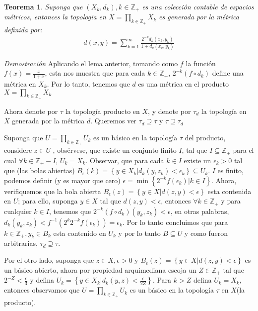 \documentclass[]{article}
\newtheorem{thm}{Teorema}
\newcommand{\set}[1]{\left\lbrace #1 \right\rbrace}
\newcommand{\ZZ}{\mathbb{Z}}
\newcommand{\contained}{\subseteq}
\begin{document}
\begin{thm}
	Suponga que $ (X_k,d_k), k \in \ZZ_+ $ es una colección  contable de espacios métricos, entonces la topologia en $ X = \prod_{k \in \ZZ_+}^{} X_k $ es generada por la métrica definida por:
	\begin{align} \label{newmetric}
	d(x,y) = \sum_{k =1}^{\infty} \frac{2^{-k} d_k(x_k,y_k)}{1 + d_k(x_k,y_k)}  
	\end{align} 
\end{thm}

\textit{Demostración} Aplicando el lema anterior, tomando como $f$ la función $f(x) = \frac{x}{1+x} $, esta nos muestra que para cada $ k \in \ZZ_+ $, $ 2^{-k}(f \circ d_k) $ define una métrica en $ X_k $. Por lo tanto, tenemos que $ d $ es una métrica en el producto $ X = \prod_{k \in \ZZ_+}^{}X_k $

Ahora denote por $ \tau $ la topología producto  en $X$, y denote por $ \tau_d $ la topología en $X$ generada por la métrica $d$. Queremos ver $  \tau_d \supseteq \tau $ y $ \tau \supseteq \tau_d $

Suponga que $  U = \prod_{k \in \ZZ_+}^{}U_k $ es un básico en la topología $ \tau $ del producto, considere $ z \in U $ , obsérvese, que existe un conjunto finito $ I $, tal que $ I \contained \ZZ_+ $ para el cual $ \forall k \in \ZZ_+ - I $, $ U_k = X_k $.  Observar, que para cada $ k \in I $ existe un $ \epsilon_k > 0 $ tal que (las bolas abiertas) $ B_\epsilon(k) = \set{ y \in X_k | d_k(y,z_k) < \epsilon_k} \contained U_k$. $ I $ es finito, podemos definir (y es mayor que cero) $ \epsilon = \operatorname{min}\set{2^{-k} f(\epsilon_k)| k \in I} $. Ahora, verifiquemos que la bola abierta $ B_\epsilon(z) = \set{y \in X | d(z,y) < \epsilon} $ esta contenida en $ U $; para ello, suponga $ y \in X $ tal que $ d(z,y) < \epsilon $, entonces $ \forall k \in \ZZ_+ $ y para cualquier $ k \in I $, tenemos que $ 2^{-k}(f \circ d_k)(y_k,z_k)<\epsilon  $, en otras palabras, $ d_k(y_k,z_k) < f^{-1}(2^k2^{-k}f(\epsilon_k)) = \epsilon_k $. Por lo tanto concluimos que para $  k \in \ZZ_+, y_k \in B_k  $ esta contenido en $ U_k $ y por lo tanto $ B \contained U $ y como fueron arbitrarias, $ \tau_d \supseteq \tau $.

Por el otro lado, suponga que $ z \in X, \epsilon >0 $ y $ B_\epsilon(z) = \set{y \in X | d(z,y) < \epsilon} $ es un básico abierto, ahora por propiedad arquimediana escoja un $ Z \in \ZZ_+ $ tal que $ 2^{-Z} < \frac{\epsilon}{3} $ y defina $ U_k = \set{y \in X_k | d_k(y,z) < \frac{\epsilon}{2Z}} $. Para $ k > Z $ defina $ U_k = X_k $, entonces observamos que $ U = \prod_{k \in \ZZ_+}^{} U_k$ es un básico en la topología $ \tau $ en $ X $(la producto).
\end{document}
